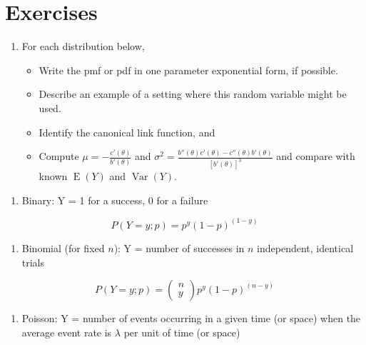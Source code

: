 \documentclass[
]{krantz}
\providecommand{\tightlist}{%
  \setlength{\itemsep}{0pt}\setlength{\parskip}{0pt}}
\newcommand{\E}{\operatorname{E}}
\newcommand{\var}{\operatorname{Var}}
\begin{document}
\hypertarget{exercises-1}{%
\section{Exercises}\label{exercises-1}}

\begin{enumerate}
\def\labelenumi{\arabic{enumi}.}
\item
  For each distribution below,

  \begin{itemize}
  \tightlist
  \item
    Write the pmf or pdf in one parameter exponential form, if possible.
  \item
    Describe an example of a setting where this random variable might be used.
  \item
    Identify the canonical link function, and
  \item
    Compute \(\mu = -\frac{c'(\theta)}{b'(\theta)}\) and \(\sigma^2 = \frac{b''(\theta)c'(\theta)-c''(\theta)b'(\theta)}{[b'(\theta)]^3}\) and compare with known \(\E(Y)\) and \(\var(Y)\).
  \end{itemize}
\end{enumerate}

\begin{enumerate}
\def\labelenumi{\alph{enumi})}
\tightlist
\item
  Binary: Y = 1 for a success, 0 for a failure
\end{enumerate}

\[P(Y=y;p)=p^{y}(1-p)^{(1-y)}
  \]

\begin{enumerate}
\def\labelenumi{\alph{enumi})}
\setcounter{enumi}{1}
\tightlist
\item
  Binomial (for fixed \(n\)): Y = number of successes in \(n\) independent, identical trials
\end{enumerate}

\[P(Y=y;p)=\left(\begin{array} {c}  n\\y  \end{array}\right) p^y(1-p)^{(n-y)}
  \]

\begin{enumerate}
\def\labelenumi{\alph{enumi})}
\setcounter{enumi}{2}
\tightlist
\item
  Poisson: Y = number of events occurring in a given time (or space) when the average event rate is \(\lambda\) per unit of time (or space)
\end{enumerate}
\end{document}
